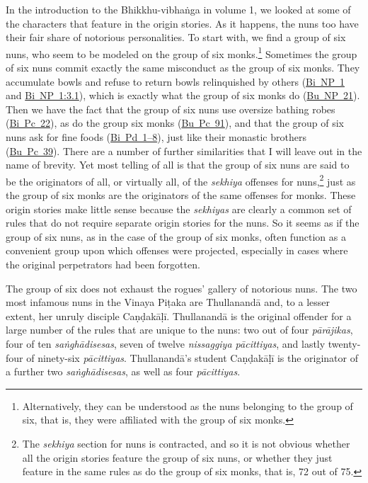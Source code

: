 \documentclass[12pt,openany]{book}%
\begin{document}
In the introduction to the Bhikkhu-\textsanskrit{vibhaṅga} in volume 1, we looked at some of the characters that feature in the origin stories. As it happens, the nuns too have their fair share of notorious personalities. To start with, we find a group of six nuns, who seem to be modeled on the group of six monks.\footnote{Alternatively, they can be understood as the nuns belonging to the group of six, that is, they were affiliated with the group of six monks. } Sometimes the group of six nuns commit exactly the same misconduct as the group of six monks. They accumulate bowls and refuse to return bowls relinquished by others (\href{https://suttacentral.net/pli-tv-bi-vb-np1/en/brahmali\#1.2}{Bi~NP~1} and \href{https://suttacentral.net/pli-tv-bi-vb-np1/en/brahmali\#3.1}{Bi~NP~1:3.1}), which is exactly what the group of six monks do (\href{https://suttacentral.net/pli-tv-bu-vb-np21/en/brahmali\#1.2}{Bu~NP~21}). Then we have the fact that the group of six nuns use oversize bathing robes (\href{https://suttacentral.net/pli-tv-bi-vb-pc22/en/brahmali\#1.4}{Bi~Pc~22}), as do the group six monks (\href{https://suttacentral.net/pli-tv-bu-vb-pc91/en/brahmali\#1.4}{Bu~Pc~91}), and that the group of six nuns ask for fine foods (\href{https://suttacentral.net/pli-tv-bi-vb-pd1/en/brahmali\#1.1.1}{Bi~Pd~1–8}), just like their monastic brothers (\href{https://suttacentral.net/pli-tv-bu-vb-pc39/en/brahmali\#1.1}{Bu~Pc~39}). There are a number of further similarities that I will leave out in the name of brevity. Yet most telling of all is that the group of six nuns are said to be the originators of all, or virtually all, of the \textit{sekhiya} offenses for nuns,\footnote{The \textit{sekhiya} section for nuns is contracted, and so it is not obvious whether all the origin stories feature the group of six nuns, or whether they just feature in the same rules as do the group of six monks, that is, 72 out of 75. } just as the group of six monks are the originators of the same offenses for monks. These origin stories make little sense because the \textit{sekhiyas} are clearly a common set of rules that do not require separate origin stories for the nuns. So it seems as if the group of six nuns, as in the case of the group of six monks, often function as a convenient group upon which offenses were projected, especially in cases where the original perpetrators had been forgotten.

The group of six does not exhaust the rogues’ gallery of notorious nuns. The two most infamous nuns in the Vinaya \textsanskrit{Piṭaka} are \textsanskrit{Thullanandā} and, to a lesser extent, her unruly disciple \textsanskrit{Caṇḍakāḷī}. \textsanskrit{Thullanandā} is the original offender for a large number of the rules that are unique to the nuns: two out of four \textit{\textsanskrit{pārājikas}}, four of ten \textit{\textsanskrit{saṅghādisesas}}, seven of twelve \textit{nissaggiya \textsanskrit{pācittiyas}}, and lastly twenty-four of ninety-six \textit{\textsanskrit{pācittiyas}}. \textsanskrit{Thullanandā}’s student \textsanskrit{Caṇḍakāḷī} is the originator of a further two \textit{\textsanskrit{saṅghādisesas}}, as well as four \textit{\textsanskrit{pācittiyas}}.
\end{document}

